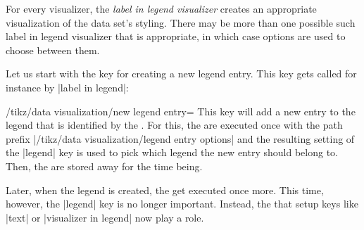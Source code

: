 For every visualizer, the \emph{label in legend visualizer} creates an
appropriate visualization of the data set's styling. There may be more than one
possible such label in legend visualizer that is appropriate, in which case
options are used to choose between them.

Let us start with the key for creating a new legend entry. This key gets called
for instance by |label in legend|:

\begin{key}{/tikz/data visualization/new legend entry=}
    This key will add a new entry to the legend that is identified by the
    . For this, the  are executed once with the
    path prefix |/tikz/data visualization/legend entry options| and the
    resulting setting of the |legend| key is used to pick which legend the new
    entry should belong to. Then, the  are stored away for the
    time being.

    Later, when the legend is created, the  get executed once
    more. This time, however, the |legend| key is no longer important. Instead,
    the  that setup keys like |text| or |visualizer in legend|
    now play a role.


\end{key}
